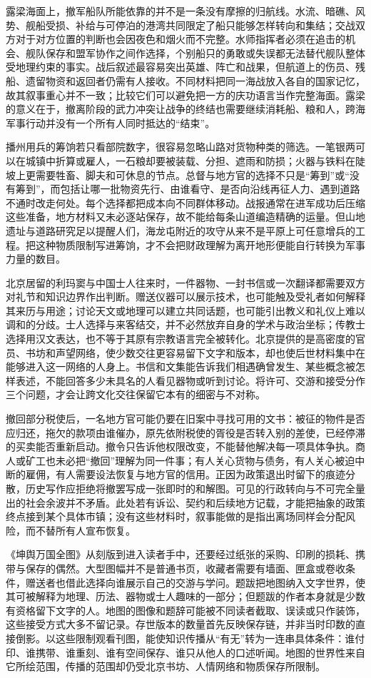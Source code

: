 露梁海面上，撤军船队所能依靠的并不是一条没有摩擦的归航线。水流、暗礁、风势、舰船受损、补给与可停泊的港湾共同限定了船只能够怎样转向和集结；交战双方对于对方位置的判断也会因夜色和烟火而不完整。水师指挥者必须在追击的机会、舰队保存和盟军协作之间作选择，个别船只的勇敢或失误都无法替代舰队整体受地理约束的事实。战后叙述最容易突出英雄、阵亡和战果，但航道上的伤员、残船、遗留物资和返回者仍需有人接收。不同材料把同一海战放入各自的国家记忆，故其叙事重心并不一致；比较它们可以避免把一方的庆功语言当作完整海面。露梁的意义在于，撤离阶段的武力冲突让战争的终结也需要继续消耗船、粮和人，跨海军事行动并没有一个所有人同时抵达的“结束”。

播州用兵的筹饷若只看部院数字，很容易忽略山路对货物种类的筛选。一笔银两可以在城镇中折算或雇人，一石粮却要被装载、分担、遮雨和防损；火器与铁料在陡坡上更需要牲畜、脚夫和可休息的节点。总督与地方官的选择不只是“筹到”或“没有筹到”，而包括让哪一批物资先行、由谁看守、是否向沿线再征人力、遇到道路不通时改走何处。每个选择都把成本向不同群体移动。战报通常在进军成功后压缩这些准备，地方材料又未必逐站保存，故不能给每条山道编造精确的运量。但山地遗址与道路研究足以提醒人们，海龙屯附近的攻守从来不是平原上可任意增兵的工程。把这种物质限制写进筹饷，才不会把财政理解为离开地形便能自行转换为军事力量的数目。

北京居留的利玛窦与中国士人往来时，一件器物、一封书信或一次翻译都需要双方对礼节和知识边界作出判断。赠送仪器可以展示技术，也可能触及受礼者如何解释其来历与用途；讨论天文或地理可以建立共同话题，也可能引出教义和礼仪上难以调和的分歧。士人选择与来客结交，并不必然放弃自身的学术与政治坐标；传教士选择用汉文表达，也不等于其原有宗教语言完全被转化。北京提供的是高密度的官员、书坊和声望网络，使少数交往更容易留下文字和版本，却也使后世材料集中在能够进入这一网络的人身上。书信和文集能告诉我们相遇确曾发生、某些概念被怎样表述，不能回答多少未具名的人看见器物或听到讨论。将许可、交游和接受分作三个问题，才会让跨文化交往保留它本有的细密与不对称。

撤回部分税使后，一名地方官可能仍要在旧案中寻找可用的文书：被征的物件是否应归还，拖欠的款项由谁催办，原先依附税使的胥役是否转入别的差使，已经停滞的买卖能否重新启动。撤令只告诉他权限改变，不能替他解决每一项具体争执。商人或矿工也未必把“撤回”理解为同一件事；有人关心货物与债务，有人关心被迫中断的雇佣，有人需要设法恢复与地方官的信用。正因为政策退出时留下的痕迹分散，历史写作应拒绝将撤罢写成一张即时的和解图。可见的行政转向与不可完全量出的社会余波并不矛盾。此处若有诉讼、契约和后续地方记载，才能把抽象的政策终点接到某个具体市镇；没有这些材料时，叙事能做的是指出离场同样会分配风险，而不替所有人宣布恢复。

《坤舆万国全图》从刻版到进入读者手中，还要经过纸张的采购、印刷的损耗、携带与保存的偶然。大型图幅并不是普通书页，收藏者需要有墙面、匣盒或卷收条件，赠送者也借此选择向谁展示自己的交游与学问。题跋把地图纳入文字世界，使其可被解释为地理、历法、器物或士人趣味的一部分；但题跋的作者本身就是少数有资格留下文字的人。地图的图像和题辞可能被不同读者截取、误读或只作装饰，这些接受方式大多不留记录。存世版本的数量首先反映保存链，并非当时印数的直接倒影。以这些限制观看刊图，能使知识传播从“有无”转为一连串具体条件：谁付印、谁携带、谁重刻、谁有空间保存、谁只从他人的口述听闻。地图的世界性来自它所绘范围，传播的范围却仍受北京书坊、人情网络和物质保存所限制。

